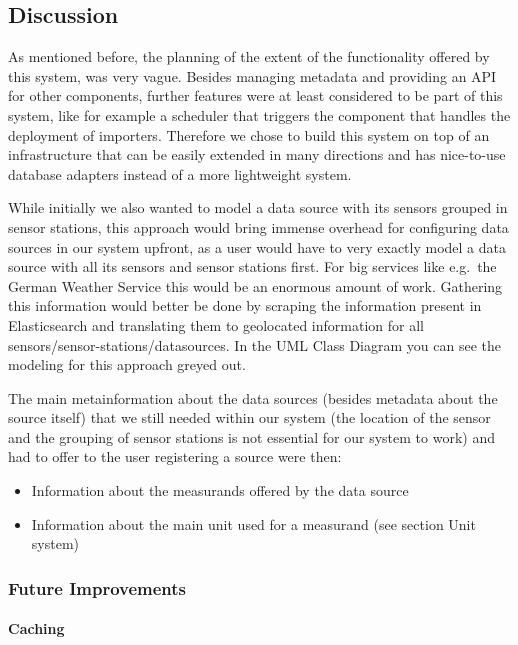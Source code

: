 \subsection{Discussion}\label{discussion}

As mentioned before, the planning of the extent of the functionality
offered by this system, was very vague. Besides managing metadata and
providing an API for other components, further features were at least
considered to be part of this system, like for example a scheduler that
triggers the component that handles the deployment of importers.
Therefore we chose to build this system on top of an infrastructure that
can be easily extended in many directions and has nice-to-use database
adapters instead of a more lightweight system.

While initially we also wanted to model a data source with its sensors
grouped in sensor stations, this approach would bring immense overhead
for configuring data sources in our system upfront, as a user would have
to very exactly model a data source with all its sensors and sensor
stations first. For big services like e.g.~the German Weather Service
this would be an enormous amount of work. Gathering this information
would better be done by scraping the information present in
Elasticsearch and translating them to geolocated information for all
sensors/sensor-stations/datasources. In the UML Class Diagram you can
see the modeling for this approach greyed out.

The main metainformation about the data sources (besides metadata about
the source itself) that we still needed within our system (the location
of the sensor and the grouping of sensor stations is not essential for
our system to work) and had to offer to the user registering a source
were then:

\begin{itemize}
\tightlist
\item
  Information about the measurands offered by the data source
\item
  Information about the main unit used for a measurand (see section Unit
  system)
\end{itemize}

\subsubsection{Future Improvements}\label{future-improvements}

\paragraph{Caching}


